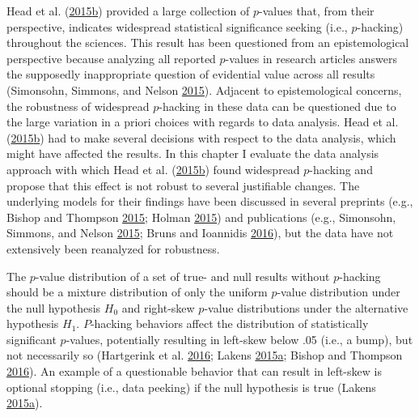 \documentclass[a5paper]{book}
\begin{document}
Head et al.
(\protect\hyperlink{ref-doi:10.1371ux2fjournal.pbio.1002106}{2015}\protect\hyperlink{ref-doi:10.1371ux2fjournal.pbio.1002106}{b})
provided a large collection of \(p\)-values that, from their
perspective, indicates widespread statistical significance seeking
(i.e., \(p\)-hacking) throughout the sciences. This result has been
questioned from an epistemological perspective because analyzing all
reported \(p\)-values in research articles answers the supposedly
inappropriate question of evidential value across all results
(Simonsohn, Simmons, and Nelson
\protect\hyperlink{ref-doi:10.1037ux2fxge0000104}{2015}). Adjacent to
epistemological concerns, the robustness of widespread \(p\)-hacking in
these data can be questioned due to the large variation in a priori
choices with regards to data analysis. Head et al.
(\protect\hyperlink{ref-doi:10.1371ux2fjournal.pbio.1002106}{2015}\protect\hyperlink{ref-doi:10.1371ux2fjournal.pbio.1002106}{b})
had to make several decisions with respect to the data analysis, which
might have affected the results. In this chapter I evaluate the data
analysis approach with which Head et al.
(\protect\hyperlink{ref-doi:10.1371ux2fjournal.pbio.1002106}{2015}\protect\hyperlink{ref-doi:10.1371ux2fjournal.pbio.1002106}{b})
found widespread \(p\)-hacking and propose that this effect is not
robust to several justifiable changes. The underlying models for their
findings have been discussed in several preprints (e.g., Bishop and
Thompson
\protect\hyperlink{ref-doi:10.7287ux2fpeerj.preprints.1266v1}{2015};
Holman
\protect\hyperlink{ref-doi:10.6084ux2fm9.figshare.1500901.v1}{2015}) and
publications (e.g., Simonsohn, Simmons, and Nelson
\protect\hyperlink{ref-doi:10.1037ux2fxge0000104}{2015}; Bruns and
Ioannidis
\protect\hyperlink{ref-doi:10.1371ux2fjournal.pone.0149144}{2016}), but
the data have not extensively been reanalyzed for robustness.

The \(p\)-value distribution of a set of true- and null results without
\(p\)-hacking should be a mixture distribution of only the uniform
\(p\)-value distribution under the null hypothesis \(H_0\) and
right-skew \(p\)-value distributions under the alternative hypothesis
\(H_1\). \(P\)-hacking behaviors affect the distribution of
statistically significant \(p\)-values, potentially resulting in
left-skew below .05 (i.e., a bump), but not necessarily so (Hartgerink
et al. \protect\hyperlink{ref-doi:10.7717ux2fpeerj.1935}{2016}; Lakens
\protect\hyperlink{ref-doi:10.1080ux2f17470218.2014.982664}{2015}\protect\hyperlink{ref-doi:10.1080ux2f17470218.2014.982664}{a};
Bishop and Thompson
\protect\hyperlink{ref-doi:10.7717ux2fpeerj.1715}{2016}). An example of
a questionable behavior that can result in left-skew is optional
stopping (i.e., data peeking) if the null hypothesis is true (Lakens
\protect\hyperlink{ref-doi:10.1080ux2f17470218.2014.982664}{2015}\protect\hyperlink{ref-doi:10.1080ux2f17470218.2014.982664}{a}).
\end{document}
